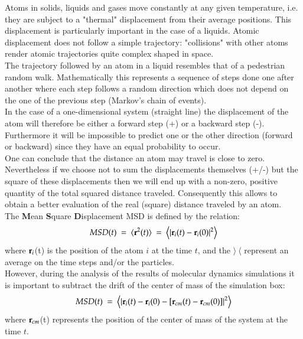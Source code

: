 Atoms in solids, liquids and gases move constantly at any given temperature, i.e. they are subject to a "thermal" displacement from their average positions. 
This displacement is particularly important in the case of a liquids. 
Atomic displacement does not follow a simple trajectory: "collisions" with other atoms render atomic trajectories quite complex shaped in space. \\
The trajectory followed by an atom in a liquid resembles that of a pedestrian random walk. 
Mathematically this represents a sequence of steps done one after another where each step follows a random direction which does not depend on the one of the previous step (Markov's chain of events). \\
In the case of a one-dimensional system (straight line) the displacement of the atom will therefore be either a forward step (+) or a backward step (-). 
Furthermore it will be impossible to predict one or the other direction (forward or backward) since they have an equal probability to occur. \\
One can conclude that the distance an atom may travel is close to zero. 
Nevertheless if we choose not to sum the displacements themselves (+/-) but the square of these displacements then we will end up with a non-zero, positive quantity of the total squared distance traveled. 
Consequently this allows to obtain a better evaluation of the real (square) distance traveled by an atom. \\
The {\bf{M}}ean {\bf{S}}quare {\bf{D}}isplacement MSD is defined by the relation:
\begin{equation}
\label{dyna1}
MSD(t)\ =\ \langle {\bf{r}}^{2}(t)\rangle\ =\ \left\langle |{\bf{r}}_{i}(t)-{\bf{r}}_{i}(0)|^{2}  \right\rangle
\end{equation}
where ${\bf{r}}_{i}$(t) is the position of the atom $i$ at the time $t$, and the $\rangle\ \langle$ represent an average on the time steps and/or the particles. \\
However, during the analysis of the results of molecular dynamics simulations it is important to subtract the drift of the center of mass of the simulation box:
\begin{equation}
\label{dyna2}
MSD(t)\ =\ \left\langle \left|{\bf{r}}_{i}(t)-{\bf{r}}_{i}(0) - \left[{\bf{r}}_{cm}(t)-{\bf{r}}_{cm}(0)\right]\right|^{2}  \right\rangle
\end{equation}
where ${\bf{r}}_{cm}$(t) represents the position of the center of mass of the system at the time $t$. \\
